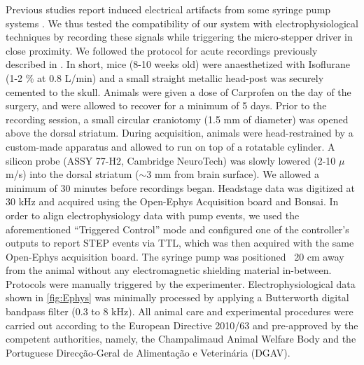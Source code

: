 Previous studies report induced electrical artifacts from some syringe pump systems \citep{Amarante2019}. We thus tested the compatibility of our system with electrophysiological techniques by recording these signals while triggering the micro-stepper driver in close proximity.
We followed the protocol for acute recordings previously described in \citep{Cruz2022}. In short, mice (8-10 weeks old) were anaesthetized with Isoflurane (1-2 \% at 0.8 L/min) and a small straight metallic head-post was securely cemented to the skull. Animals were given a dose of Carprofen on the day of the surgery, and were allowed to recover for a minimum of 5 days. Prior to the recording session, a small circular craniotomy (1.5 mm of diameter) was opened above the dorsal striatum. During acquisition, animals were head-restrained by a custom-made apparatus and allowed to run on top of a rotatable cylinder. A silicon probe (ASSY 77-H2, Cambridge NeuroTech) was slowly lowered (2-10 $\mu$m/s) into the dorsal striatum ($\sim$3 mm from brain surface). We allowed a minimum of 30 minutes before recordings began. Headstage data was digitized at 30 kHz and acquired using the Open-Ephys Acquisition board and Bonsai. In order to align electrophysiology data with pump events, we used the aforementioned “Triggered Control” mode and configured one of the controller’s outputs to report STEP events via TTL, which was then acquired with the same Open-Ephys acquisition board. The syringe pump was positioned ~20 cm away from the animal without any electromagnetic shielding material in-between. Protocols were manually triggered by the experimenter.
Electrophysiological data shown in \cref{fig:Ephys} was minimally processed by applying a Butterworth digital bandpass filter (0.3 to 8 kHz).
All animal care and experimental procedures were carried out according to the European Directive 2010/63 and pre-approved by the competent authorities, namely, the Champalimaud Animal Welfare Body and the Portuguese Direc\c{c}\~ao-Geral de Alimenta\c{c}\~ao e Veterin\'aria (DGAV).



